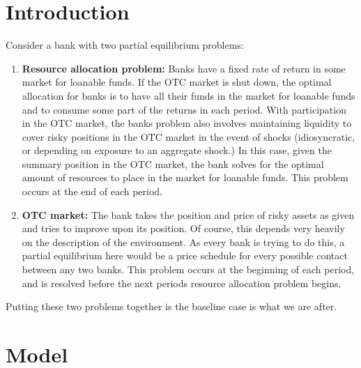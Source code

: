 \documentclass [12pt] {article}
\begin{document}
\section{Introduction}\label{section:introduction}
Consider a bank with two partial equilibrium problems:
\begin{enumerate}
\item \textbf{Resource allocation problem: } Banks have a fixed rate of return in some market for loanable funds. If the OTC market is shut down, the optimal allocation for banks is to have all their funds in the market for loanable funds and to consume some part of the returns in each period. With participation in the OTC market, the banks problem also involves maintaining liquidity to cover risky positions in the OTC market in the event of shocks (idiosyncratic, or depending on exposure to an aggregate shock.) In this case, given the summary position in the OTC market, the bank solves for the optimal amount of resources to place in the market for loanable funds. This problem occurs at the end of each period. 
\item \textbf{OTC market: } The bank takes the position and price of risky assets as given and tries to improve upon its position. Of course, this depends very heavily on the description of the environment. As every bank is trying to do this, a partial equilibrium here would be a price schedule for every possible contact between any two banks. This problem occurs at the beginning of each period, and is resolved before the next periods resource allocation problem begins.
\end{enumerate}
Putting these two problems together is the baseline case is what we are after.

\section{Model}\label{section:model}
\end{document}

